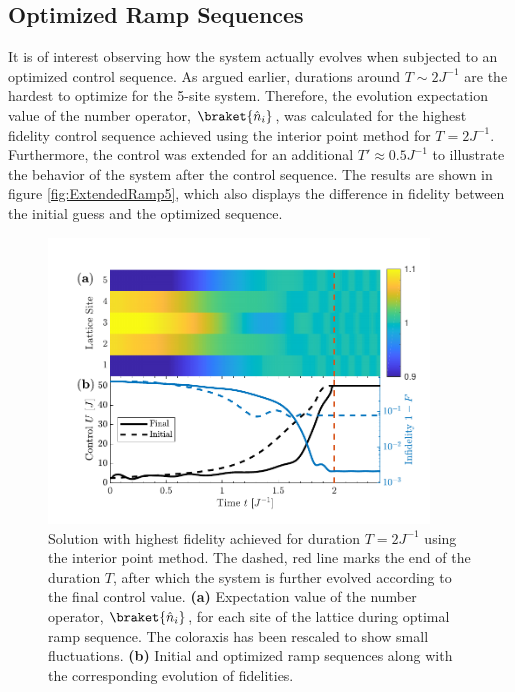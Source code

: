\subsection{Optimized Ramp Sequences}
It is of interest observing how the system actually evolves when subjected to an optimized control sequence. As argued earlier, durations around $T \sim 2 J^{-1}$ are the hardest to optimize for the 5-site system. Therefore, the evolution expectation value of the number operator, $\braket{\hat{n}_i}$, was calculated for the highest fidelity control sequence achieved using the interior point method for $T = 2 J^{-1}$. Furthermore, the control was extended for an additional $T ' \approx 0.5 J^{-1}$ to illustrate the behavior of the system after the control sequence. The results are shown in figure \ref{fig:ExtendedRamp5}, which also displays the difference in fidelity between the initial guess and the optimized sequence.
\begin{figure}[h!]
    \centering
    \includegraphics[width=0.9\textwidth]{Figures/L5/RampPlot.pdf}
    \caption{Solution with highest fidelity achieved for duration $T = 2 J^{-1}$ using the interior point method. The dashed, red line marks the end of the duration $T$, after which the system is further evolved according to the final control value. \textbf{(a)} Expectation value of the number operator, $\braket{\hat{n}_i}$, for each site of the lattice during optimal ramp sequence. The coloraxis has been rescaled to show small fluctuations. \textbf{(b)} Initial and optimized ramp sequences along with the corresponding evolution of fidelities.}
    \label{fig:ExtendedRamp}
\end{figure} 

